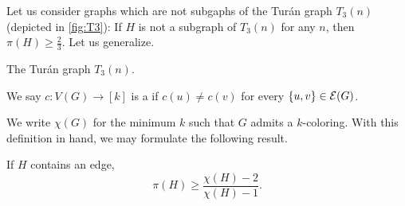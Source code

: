 Let us consider graphs which are not subgaphs of the Tur\'an graph $T_{3}(n)$ (depicted in \cref{fig:T3}): 
If $H$ is not a subgraph of $T_3(n)$ for any $n$, then $\pi(H)\geq \frac{2}{3}$. Let us generalize.
\begin{marginfigure}[-2cm]
\begin{center}
\end{center}
\caption{The Tur\'an graph $T_3(n)$.} \label{fig:T3}
\end{marginfigure}


 We say $c\!\!: V(G) \to [k]$ is a  if $c(u)\neq c(v)$ for every $\{u,v\}\in \mathcal{E} (G)$.

We write $\chi(G)$ for the minimum $k$ such that $G$ admits a $k$-coloring. With this definition in hand, we may formulate the following result.
\begin{lemma} \label{lem:min_Tur\'an_density_2graphs}
If $H$ contains an edge,
\[
\pi(H)\geq \frac{\chi(H)-2}{\chi(H)-1}.
\]
\end{lemma}

